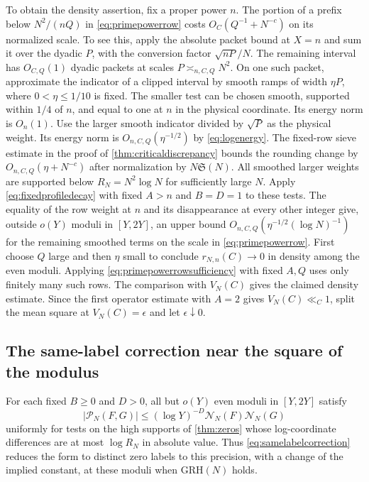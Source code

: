 \documentclass[11pt,a4paper]{article}
\numberwithin{equation}{section}
\newcommand{\SSS}{\mathfrak S}
\newcommand{\grh}{\mathrm{GRH}}
\newcommand{\NN}{\mathcal N_N}
\begin{document}
To obtain the density assertion, fix a proper power $n$.
The portion of a prefix below $N^2/(nQ)$ in
\cref{eq:primepowerrow} costs $O_C(Q^{-1}+N^{-c})$ on
its normalized scale. To see this, apply the absolute
packet bound at $X=n$ and sum it over the dyadic $P$,
with the conversion factor $\sqrt{nP}/N$.
The remaining interval has $O_{C,Q}(1)$ dyadic
packets at scales $P\asymp_{n,C,Q}N^2$. On one
such packet, approximate the indicator of a clipped
interval by smooth ramps of width $\eta P$, where
$0<\eta\le1/10$ is fixed. The smaller test can be
chosen smooth, supported within $1/4$ of $n$, and
equal to one at $n$ in the physical coordinate.
Its energy norm is $O_n(1)$.
Use the larger smooth indicator divided by $\sqrt P$
as the physical weight. Its energy norm is
$O_{n,C,Q}(\eta^{-1/2})$ by \cref{eq:logenergy}.
The fixed-row sieve estimate in the proof of
\cref{thm:criticaldiscrepancy} bounds the rounding change
by $O_{n,C,Q}(\eta+N^{-c})$ after normalization by
$N\SSS(N)$.
All smoothed larger weights are supported below
$R_N=N^2\log N$ for sufficiently large $N$.
Apply \cref{eq:fixedprofiledecay} with fixed $A>n$ and
$B=D=1$ to these tests. The equality of the row weight
at $n$ and its disappearance at every other integer
give, outside $o(Y)$ moduli in $[Y,2Y]$, an upper bound
$O_{n,C,Q}(\eta^{-1/2}(\log N)^{-1})$ for the remaining
smoothed terms on the scale in \cref{eq:primepowerrow}.
First choose $Q$ large and then $\eta$
small to conclude $r_{N,n}(C)\to0$ in density among the
even moduli. Applying \cref{eq:primepowerrowsufficiency}
with fixed $A,Q$ uses only finitely many such rows.
The comparison with $V_N(C)$ gives the claimed density
estimate. Since the first operator estimate with $A=2$
gives $V_N(C)\ll_C1$, split the mean square at
$V_N(C)=\epsilon$ and let $\epsilon\downarrow0$.

\subsection{The same-label correction near the square of the modulus}

For each fixed $B\ge0$ and $D>0$, all but $o(Y)$ even
moduli in $[Y,2Y]$ satisfy
\begin{equation}
 |\mathcal P_N(F,G)|\le(\log Y)^{-D}\NN(F)\NN(G)
 \label{eq:samelabelmean}
\end{equation}
uniformly for tests on the high supports of \cref{thm:zeros}
whose log-coordinate differences are at most $\log R_N$ in
absolute value. Thus \cref{eq:samelabelcorrection} reduces
the form to distinct zero labels to this precision,
with a change of the implied constant, at these moduli
when $\grh(N)$ holds.
\end{document}
